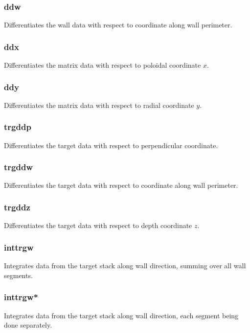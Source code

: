 \documentclass[a4paper,10pt]{report}
\begin{document}
\subsubsection{ddw}\label{sec:ddw}
Differentiates the wall data with respect to coordinate along wall perimeter.

\subsubsection{ddx}\label{sec:ddx}
Differentiates the matrix data with respect to poloidal coordinate $x$.

\subsubsection{ddy}\label{sec:ddy}
Differentiates the matrix data with respect to radial coordinate $y$.

\subsubsection{trgddp}\label{sec:trgddp}
Differentiates the target data with respect to perpendicular coordinate.

\subsubsection{trgddw}\label{sec:trgddw}
Differentiates the target data with respect to coordinate along wall perimeter.

\subsubsection{trgddz}\label{sec:trgddz}
Differentiates the target data with respect to depth coordinate $z$.

\subsubsection{inttrgw}\label{sec:inttrgw}
Integrates data from the target stack along wall direction, summing over all wall segments.

\subsubsection{inttrgw*}\label{sec:inttrgw*}
Integrates data from the target stack along wall direction, each segment being done separately.
\end{document}
